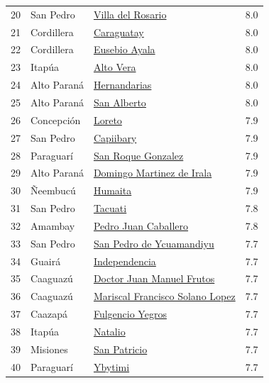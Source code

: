 {\begin{longtable}[]{@{}llll@{}}
20 & San Pedro & \hyperref[dist:02_San_Pedro:Villa_del_Rosario]{Villa del Rosario} & 8.0 \\
21 & Cordillera & \hyperref[dist:03_Cordillera:Caraguatay]{Caraguatay} & 8.0 \\
22 & Cordillera & \hyperref[dist:03_Cordillera:Eusebio_Ayala]{Eusebio Ayala} & 8.0 \\
23 & Itapúa & \hyperref[dist:07_Itapua:Alto_Vera]{Alto Vera} & 8.0 \\
24 & Alto Paraná & \hyperref[dist:10_Alto_Parana:Hernandarias]{Hernandarias} & 8.0 \\
25 & Alto Paraná & \hyperref[dist:10_Alto_Parana:San_Alberto]{San Alberto} & 8.0 \\
26 & Concepción & \hyperref[dist:01_Concepción:Loreto]{Loreto} & 7.9 \\
27 & San Pedro & \hyperref[dist:02_San_Pedro:Capiibary]{Capiibary} & 7.9 \\
28 & Paraguarí & \hyperref[dist:09_Paraguari:San_Roque_Gonzalez]{San Roque Gonzalez} & 7.9 \\
29 & Alto Paraná & \hyperref[dist:10_Alto_Parana:Domingo_Martinez_de_Irala]{Domingo Martinez de Irala} & 7.9 \\
30 & Ñeembucú & \hyperref[dist:12_Neembucu:Humaita]{Humaita} & 7.9 \\
31 & San Pedro & \hyperref[dist:02_San_Pedro:Tacuati]{Tacuati} & 7.8 \\
32 & Amambay & \hyperref[dist:13_Amambay:Pedro_Juan_Caballero]{Pedro Juan Caballero} & 7.8 \\
33 & San Pedro & \hyperref[dist:02_San_Pedro:San_Pedro_de_Ycuamandiyu]{San Pedro de Ycuamandiyu} & 7.7 \\
34 & Guairá & \hyperref[dist:04_Guaira:Independencia]{Independencia} & 7.7 \\
35 & Caaguazú & \hyperref[dist:05_Caaguazu:Doctor_Juan_Manuel_Frutos]{Doctor Juan Manuel Frutos} & 7.7 \\
36 & Caaguazú & \hyperref[dist:05_Caaguazu:Mariscal_Francisco_Solano_Lopez]{Mariscal Francisco Solano Lopez} & 7.7 \\
37 & Caazapá & \hyperref[dist:06_Caazapa:Fulgencio_Yegros]{Fulgencio Yegros} & 7.7 \\
38 & Itapúa & \hyperref[dist:07_Itapua:Natalio]{Natalio} & 7.7 \\
39 & Misiones & \hyperref[dist:08_Misiones:San_Patricio]{San Patricio} & 7.7 \\
40 & Paraguarí & \hyperref[dist:09_Paraguari:Ybytimi]{Ybytimi} & 7.7 \\

\end{longtable}}
